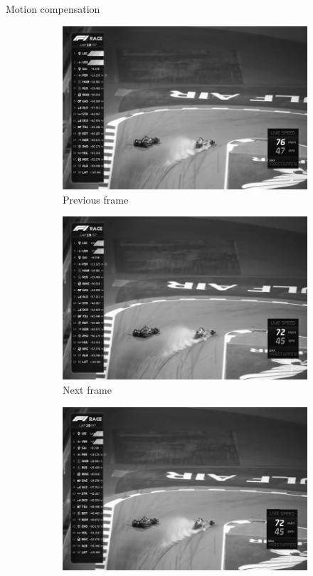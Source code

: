 \documentclass[aspectratio=1610,xcolor=dvipsnames]{beamer}
\begin{document}
\begin{frame}{Motion compensation}
    \begin{figure}[htbp]
        \begin{subfigure}[b]{0.3\textwidth}
            \centering
            \includegraphics[width=.9\textwidth]{images/race-previous.png}
            \caption{Previous frame}
            \label{fig:race-prev-frame}
        \end{subfigure}
        \hfill
        \begin{subfigure}[b]{0.3\textwidth}
            \includegraphics[width=.9\textwidth]{images/race-current.png}
            \caption{Next frame}
            \label{fig:race-curr-frame}
        \end{subfigure}
        \hfill
        \begin{subfigure}[b]{0.3\textwidth}
            \includegraphics[width=.9\textwidth]{images/race-compensated.png}

\end{subfigure}
\end{figure}
\end{frame}
\end{document}
